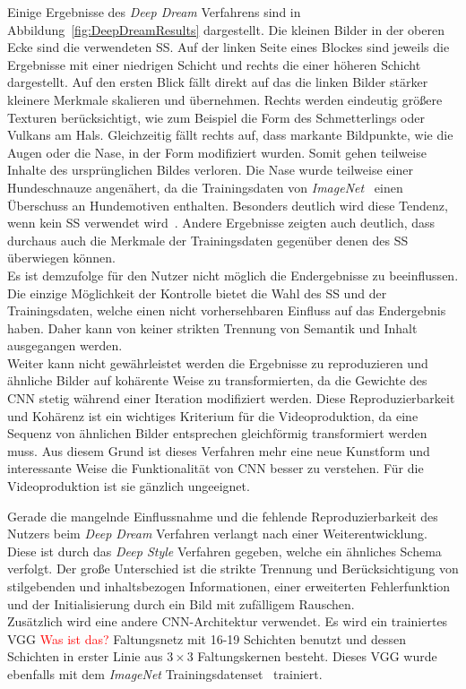 \documentclass[times, 11pt,twocolumn]{article}
\begin{document}
Einige Ergebnisse des \textit{Deep Dream} Verfahrens sind in Abbildung~\ref{fig:DeepDreamResults} dargestellt. Die kleinen Bilder in der oberen Ecke sind die verwendeten SS. Auf der linken Seite eines Blockes sind jeweils die Ergebnisse mit einer niedrigen Schicht und rechts die einer höheren Schicht dargestellt. Auf den ersten Blick fällt direkt auf das die linken Bilder stärker kleinere Merkmale skalieren und übernehmen. Rechts werden eindeutig größere Texturen berücksichtigt, wie zum Beispiel die Form des Schmetterlings oder Vulkans am Hals. Gleichzeitig fällt rechts auf, dass markante Bildpunkte, wie die Augen oder die Nase, in der Form modifiziert wurden. Somit gehen teilweise Inhalte des ursprünglichen Bildes verloren. Die Nase wurde teilweise einer Hundeschnauze angenähert, da die Trainingsdaten von \textit{ImageNet}~\cite{ImageNet} einen Überschuss an Hundemotiven enthalten. Besonders deutlich wird diese Tendenz, wenn kein SS verwendet wird~\cite{McCaigDG16}. Andere Ergebnisse zeigten auch deutlich, dass durchaus auch die Merkmale der Trainingsdaten gegenüber denen des SS überwiegen können.
\\
Es ist demzufolge für den Nutzer nicht möglich die Endergebnisse zu beeinflussen. Die einzige Möglichkeit der Kontrolle bietet die Wahl des SS und der Trainingsdaten, welche einen nicht vorhersehbaren Einfluss auf das Endergebnis haben. Daher kann von keiner strikten Trennung von Semantik und Inhalt ausgegangen werden. \\
Weiter kann nicht gewährleistet werden die Ergebnisse zu reproduzieren und ähnliche Bilder auf kohärente Weise zu transformierten, da die Gewichte des CNN stetig während einer Iteration modifiziert werden. Diese Reproduzierbarkeit und Kohärenz ist ein wichtiges Kriterium für die Videoproduktion, da eine Sequenz von ähnlichen Bilder entsprechen gleichförmig transformiert werden muss. Aus diesem Grund ist dieses Verfahren mehr eine neue Kunstform und interessante Weise die Funktionalität von CNN besser zu verstehen. Für die Videoproduktion ist sie gänzlich ungeeignet.



\label{sec:DeepStyle}
Gerade die mangelnde Einflussnahme und die fehlende Reproduzierbarkeit des Nutzers beim \textit{Deep Dream} Verfahren \cite{DeepDream} verlangt nach einer Weiterentwicklung. Diese ist durch das \textit{Deep Style} Verfahren \cite{GatysEB15a} gegeben, welche ein ähnliches Schema verfolgt. Der große Unterschied ist die strikte Trennung und Berücksichtigung von stilgebenden und inhaltsbezogen Informationen, einer erweiterten Fehlerfunktion und der Initialisierung durch ein Bild mit zufälligem Rauschen.\\
Zusätzlich wird eine andere CNN-Architektur verwendet. Es wird ein trainiertes VGG \textcolor{red}{Was ist das?} Faltungsnetz \cite{SimonyanZ14a} mit 16-19 Schichten benutzt und dessen Schichten in erster Linie aus $3\times3$ Faltungskernen besteht. Dieses VGG wurde ebenfalls mit dem \textit{ImageNet} Trainingsdatenset~\cite{ImageNet} trainiert.
\end{document}
